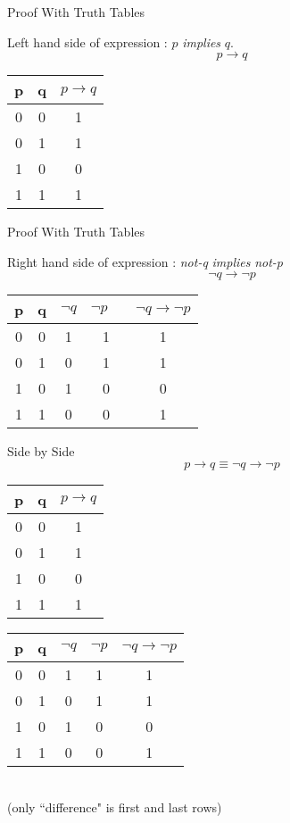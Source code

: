 \documentclass{beamer}
\begin{document}
\begin{frame}
{Proof With Truth Tables}

Left hand side of expression : $p$ \textit{implies} $q$.
\[p \rightarrow q\]
\begin{center}
\begin{tabular}{|c|c||c|}
\hline  \phantom{spa}p\phantom{spa}&  \phantom{spa}q\phantom{spa}& \phantom{sp}$p \rightarrow q$ \phantom{sp} \\ 
\hline  0&  0&  1\\ 
\hline  0&  1&  1\\ 
\hline  1&  0&  0\\ 
\hline  1&  1&  1\\ 
\hline 
\end{tabular} 
\end{center}



{Proof With Truth Tables}

Right hand side of expression : \textit{not-q} \textit{implies} \textit{not-p}
\[\neg q \rightarrow \neg p\]
\begin{center}
\begin{tabular}{|c|c||c|c|c|}
\hline  \phantom{sp}p\phantom{sp}&  \phantom{sp}q\phantom{sp}&\phantom{sp} $\neg q$ \phantom{sp} & \phantom{sp} $\neg p \phantom{sp}$ & $\neg q \rightarrow \neg p$ \\ 
\hline  0&  0& 1& 1& 1\\ 
\hline  0&  1& 0& 1& 1\\ 
\hline  1&  0& 1& 0& 0\\ 
\hline  1&  1& 0& 0& 1\\ 
\hline 
\end{tabular}
\end{center}


Side by Side
\[ p \rightarrow q \equiv \neg q \rightarrow \neg p\]
\bigskip
{ 
\hspace{0.5cm} \begin{tabular}{|c|c||c|}
\hline  p&  q& $p \rightarrow q$ \\ 
\hline  0&  0&  1\\ 
\hline  0&  1&  1\\ 
\hline  1&  0&  0\\ 
\hline  1&  1&  1\\ 
\hline 
\end{tabular} \hspace{0.5cm} \begin{tabular}{|c|c||c|c|c|}
\hline  p&  q& $\neg q$ & $\neg p$ & $\neg q \rightarrow \neg p$ \\ 
\hline  0&  0& 1& 1& 1\\ 
\hline  0&  1& 0& 1& 1\\ 
\hline  1&  0& 1& 0& 0\\ 
\hline  1&  1& 0& 0& 1\\ 
\hline 
\end{tabular}
}\\
(only ``difference" is first and last rows)
\end{frame}
\end{document}
